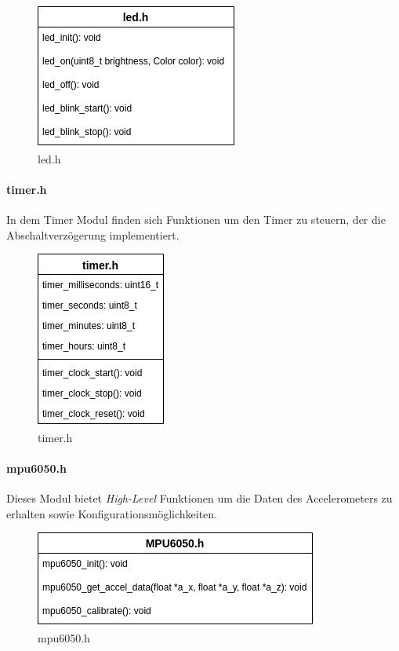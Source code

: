             \begin{figure}[H]
                \centering
                \includegraphics[scale=0.6]{img/led.png}
                \caption{led.h}
            \end{figure}

        \paragraph{timer.h}
            In dem Timer Modul finden sich Funktionen um den Timer zu steuern, der
            die Abschaltverzögerung implementiert.

            \begin{figure}[H]
                \centering
                \includegraphics[scale=0.6]{img/timer.png}
                \caption{timer.h}
            \end{figure}

        \paragraph{mpu6050.h}
            Dieses Modul bietet \textit{High-Level} Funktionen um die Daten
            des Accelerometers zu erhalten sowie Konfigurationsmöglichkeiten.
            
            \begin{figure}[H]
                \centering
                \includegraphics[scale=0.6]{img/mpu.png}
                \caption{mpu6050.h}
            \end{figure}

